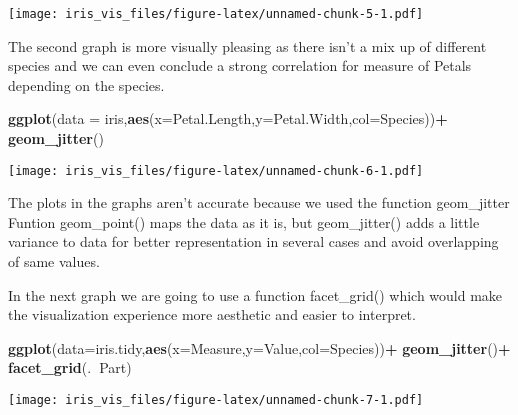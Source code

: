 \documentclass[
]{article}
\newenvironment{Shaded}{\begin{snugshade}}{\end{snugshade}}
\newcommand{\DataTypeTok}[1]{\textcolor[rgb]{0.13,0.29,0.53}{#1}}
\newcommand{\KeywordTok}[1]{\textcolor[rgb]{0.13,0.29,0.53}{\textbf{#1}}}
\newcommand{\NormalTok}[1]{#1}
\newcommand{\OperatorTok}[1]{\textcolor[rgb]{0.81,0.36,0.00}{\textbf{#1}}}
\newcommand{\StringTok}[1]{\textcolor[rgb]{0.31,0.60,0.02}{#1}}
\begin{document}
\texttt{[image: iris\_vis\_files/figure-latex/unnamed-chunk-5-1.pdf]}

The second graph is more visually pleasing as there isn't a mix up of
different species and we can even conclude a strong correlation for
measure of Petals depending on the species.

\begin{Shaded}
\begin{Highlighting}[]
\KeywordTok{ggplot}\NormalTok{(}\DataTypeTok{data =}\NormalTok{ iris,}\KeywordTok{aes}\NormalTok{(}\DataTypeTok{x=}\NormalTok{Petal.Length,}\DataTypeTok{y=}\NormalTok{Petal.Width,}\DataTypeTok{col=}\NormalTok{Species))}\OperatorTok{+}
\StringTok{  }\KeywordTok{geom_jitter}\NormalTok{()}
\end{Highlighting}
\end{Shaded}

\texttt{[image: iris\_vis\_files/figure-latex/unnamed-chunk-6-1.pdf]}

The plots in the graphs aren't accurate because we used the function
geom\_jitter Funtion geom\_point() maps the data as it is, but
geom\_jitter() adds a little variance to data for better representation
in several cases and avoid overlapping of same values.

In the next graph we are going to use a function facet\_grid() which
would make the visualization experience more aesthetic and easier to
interpret.

\begin{Shaded}
\begin{Highlighting}[]
\KeywordTok{ggplot}\NormalTok{(}\DataTypeTok{data=}\NormalTok{iris.tidy,}\KeywordTok{aes}\NormalTok{(}\DataTypeTok{x=}\NormalTok{Measure,}\DataTypeTok{y=}\NormalTok{Value,}\DataTypeTok{col=}\NormalTok{Species))}\OperatorTok{+}
\StringTok{  }\KeywordTok{geom_jitter}\NormalTok{()}\OperatorTok{+}
\StringTok{  }\KeywordTok{facet_grid}\NormalTok{(.}\OperatorTok{~}\NormalTok{Part)}
\end{Highlighting}
\end{Shaded}

\texttt{[image: iris\_vis\_files/figure-latex/unnamed-chunk-7-1.pdf]}
\end{document}
